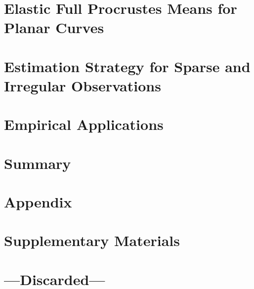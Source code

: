 \documentclass[a4paper,12pt,english,headings=small]{scrreprt}
\begin{document}
\newpage
\chapter{Elastic Full Procrustes Means for Planar Curves}
\label{sec:theo}


\newpage
\chapter{Estimation Strategy for Sparse and Irregular Observations}
\label{sec:est}


\newpage
\chapter{Empirical Applications}
\label{sec:app}


\newpage
\chapter{Summary}
\label{sec:sum}



\newpage
\nocite{*}
\printbibliography[heading=bibintoc] %



\newpage
\appendix
\chapter{Appendix}
\label{app:app}


\newpage
\chapter{Supplementary Materials}
\label{app:sup}


\newpage
\chapter*{---Discarded---}

\end{document}
